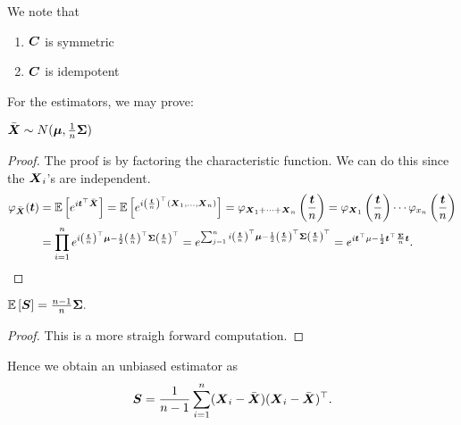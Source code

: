 We note that 
\begin{enumerate}
    \item $\boldsymbol{C}$ is symmetric
    \item $\boldsymbol{C}$ is idempotent
\end{enumerate}
For the estimators, we may prove:
\begin{proposition}
    $\bar{\boldsymbol{X}} \sim N(\boldsymbol{\mu}, \frac{1}{n}\boldsymbol{\Sigma})$
\end{proposition}
\begin{proof}
    The proof is by factoring the characteristic function. We can do this since the $\boldsymbol{X}_i$'s are independent.
    \begin{align*}
        \varphi_{\bar{\boldsymbol{X}}}(\boldsymbol{t}) 
        &= \mathbb{E}\left[e^{i \boldsymbol{t}^\top \bar{\boldsymbol{X}}}\right]
        = \mathbb{E}\left[ e^{i \left(\frac{\boldsymbol{t}}{n}\right)^\top (\boldsymbol{X}_1, \ldots, \boldsymbol{X}_n)} \right]
        = \varphi_{\boldsymbol{X}_1+\dots+\boldsymbol{X}_n} \left(\frac{\boldsymbol{t}}{n}\right)
        = \varphi_{\boldsymbol{X}_1} \left( \frac{\boldsymbol{t}}{n} \right) \cdots \varphi_{x_n} \left( \frac{\boldsymbol{t}}{n} \right)
        \\&= \prod_{i=1}^{n} e^{ i \left(\frac{\boldsymbol{t}}{n}\right)^\top\boldsymbol{\mu} - \frac{1}{2} \left(\frac{\boldsymbol{t}}{n}\right)^\top \boldsymbol{\Sigma} \left(\frac{\boldsymbol{t}}{n}\right)^\top }
        = e^{\sum_{j=1}^{n} i \left(\frac{\boldsymbol{t}}{n}\right)^\top\boldsymbol{\mu} - \frac{1}{2} \left(\frac{\boldsymbol{t}}{n}\right)^\top \boldsymbol{\Sigma} \left(\frac{\boldsymbol{t}}{n}\right)^\top}
        = e^{ i \boldsymbol{t}^\top \mu - \frac{1}{2} \boldsymbol{t}^\top \frac{\boldsymbol{\Sigma}}{n} \boldsymbol{t} }.
    \end{align*}

\end{proof}
\begin{proposition}
    $\mathbb{E}\left[\boldsymbol{S}\right] = \frac{n-1}{n} \boldsymbol{\Sigma}.$
\end{proposition}
\begin{proof}
    This is a more straigh forward computation.
\end{proof}
Hence we obtain an unbiased estimator as
$$
    \boldsymbol{S} = \frac{1}{n-1} \sum_{i=1}^n (\boldsymbol{X}_i-\bar{\boldsymbol{X}})(\boldsymbol{X}_i-\bar{\boldsymbol{X}})^\top.
$$

